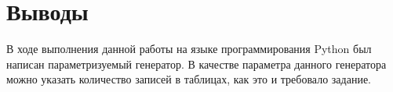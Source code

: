 \newpage
\section{Выводы}

В ходе выполнения данной работы на языке программирования Python был написан параметризуемый генератор.
В качестве параметра данного генератора можно указать количество записей в таблицах, как это и требовало задание.


